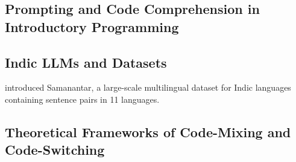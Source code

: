\subsection{Prompting and Code Comprehension in Introductory Programming}






\subsection{Indic LLMs and Datasets}

\citet{ramesh_samanantar_2022} introduced Samanantar, a large-scale multilingual
dataset for Indic languages containing sentence pairs in 11 languages. 


\subsection{Theoretical Frameworks of Code-Mixing and Code-Switching}

